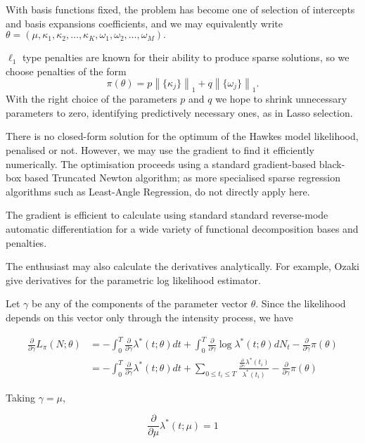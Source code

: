 \documentclass[11pt]{article}
\begin{document}
    With basis functions fixed, the problem has become one of selection of
intercepts and basis expansions coefficients, and we may equivalently
write
\(\theta=(\mu, \kappa_1,\kappa_2,\dots,\kappa_K,\omega_1, \omega_2,\dots,\omega_M).\)

\(\ell_1\) type penalties are known for their ability to produce sparse
solutions, so we choose penalties of the form
\[\pi(\theta)=p\left\|\{\kappa_j\}\right\|_1+q\left\|\{\omega_j\}\right\|_1.\]
With the right choice of the parameters \(p\) and \(q\) we hope to
shrink unnecessary parameters to zero, identifying predictively
necessary ones, as in Lasso selection.

    There is no closed-form solution for the optimum of the Hawkes model
likelihood, penalised or not. However, we may use the gradient to find
it efficiently numerically. The optimisation proceeds using a standard
gradient-based black-box based Truncated Newton algorithm; as more
specialised sparse regression algorithms such as Least-Angle Regression,
do not directly apply here.

The gradient is efficient to calculate using standard standard
reverse-mode automatic differentiation \cite{baydin_automatic_2014} for
a wide variety of functional decomposition bases and penalties.

The enthusiast may also calculate the derivatives analytically. For
example, Ozaki \cite{ozaki_maximum_1979} give derivatives for the
parametric log likelihood estimator.

    Let \(\gamma\) be any of the components of the parameter vector
\(\theta\). Since the likelihood depends on this vector only through the
intensity process, we have

\[\begin{aligned}
{ \scriptstyle \frac{\partial}{\partial\gamma} } L_\pi(N;\theta)&=-\int_0^T{ \scriptstyle \frac{\partial}{\partial\gamma} }\lambda^*(t;\theta)dt + \int_0^T { \scriptstyle \frac{\partial}{\partial\gamma} }\log \lambda^*(t;\theta) dN_t -{ \scriptstyle \frac{\partial}{\partial\gamma} }\pi(\theta) \\
&=-\int_0^T{ \scriptstyle \frac{\partial}{\partial\gamma} }\lambda^*(t;\theta)dt + \sum_{0\leq t_i\leq T} \frac{{ \scriptstyle \frac{\partial}{\partial\gamma} }\lambda^*(t_i)}{\lambda^*(t_i)} -{ \scriptstyle \frac{\partial}{\partial\gamma} }\pi(\theta)
\end{aligned}
\]

    Taking \(\gamma=\mu\),

\[{ \scriptstyle \frac{\partial}{\partial\mu} }\lambda^*(t;\mu) = 1\]
\end{document}
